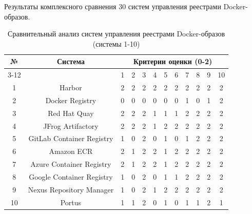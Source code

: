 
Результаты комплексного сравнения 30 систем управления реестрами Docker-образов.

\begingroup
\setcounter{table}{0}
\renewcommand{\thetable}{A.\arabic{table}}

\begin{table}[h!]
	\centering
	\caption{Сравнительный анализ систем управления реестрами Docker-образов (системы 1-10)}
	\label{table:comparison-1}
	\footnotesize
	\setlength{\tabcolsep}{2pt}
	\begin{tabular}{|c|c|cccccccccc|}
		\hline
		\multirow{2}{*}{№} & 
		\multirow{2}{*}{Система} & 
		\multicolumn{10}{c|}{Критерии оценки (0-2)} \\
		\cline{3-12}
		& & 1 & 2 & 3 & 4 & 5 & 6 & 7 & 8 & 9 & 10 \\
		\hline
		1 & Harbor & 2 & 2 & 2 & 2 & 2 & 2 & 2 & 2 & 2 & 2 \\
		2 & Docker Registry & 0 & 0 & 0 & 0 & 0 & 0 & 1 & 0 & 1 & 2 \\
		3 & Red Hat Quay & 2 & 2 & 2 & 1 & 1 & 1 & 2 & 2 & 2 & 2 \\
		4 & JFrog Artifactory & 2 & 2 & 2 & 1 & 2 & 2 & 2 & 2 & 2 & 2 \\
		5 & GitLab Container Registry & 1 & 0 & 2 & 0 & 1 & 0 & 1 & 2 & 2 & 2 \\
		6 & Amazon ECR & 2 & 1 & 2 & 2 & 1 & 2 & 2 & 2 & 2 & 2 \\
		7 & Azure Container Registry & 2 & 1 & 2 & 2 & 1 & 2 & 2 & 2 & 2 & 2 \\
		8 & Google Container Registry & 1 & 0 & 2 & 0 & 1 & 1 & 2 & 2 & 2 & 2 \\
		9 & Nexus Repository Manager & 1 & 0 & 2 & 1 & 2 & 2 & 2 & 2 & 2 & 2 \\
		10 & Portus & 1 & 1 & 2 & 0 & 1 & 0 & 1 & 1 & 2 & 1 \\
		\hline
	\end{tabular}
\end{table}

\setcounter{table}{1}
\renewcommand{\thetable}{A.\arabic{table}}

